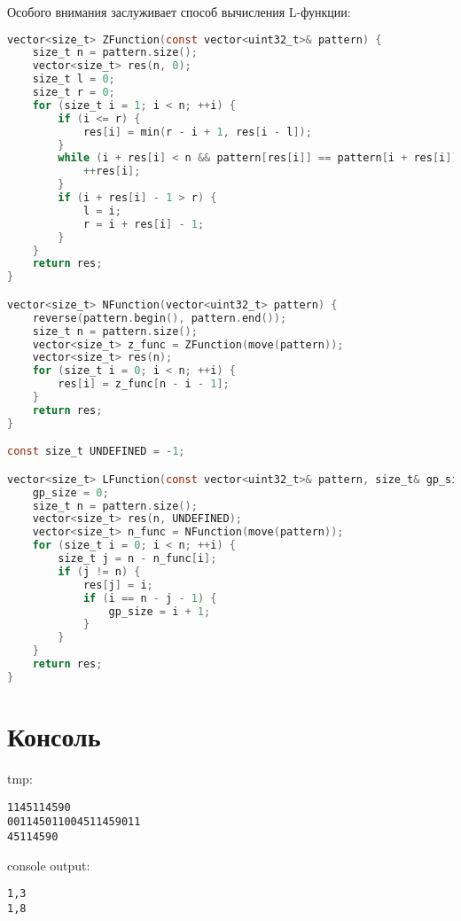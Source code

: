 Особого внимания заслуживает способ вычисления L-функции:
\begin{lstlisting}[language=C]
vector<size_t> ZFunction(const vector<uint32_t>& pattern) {
	size_t n = pattern.size();
	vector<size_t> res(n, 0);
	size_t l = 0;
	size_t r = 0;
	for (size_t i = 1; i < n; ++i) {
		if (i <= r) {
			res[i] = min(r - i + 1, res[i - l]);
		}
		while (i + res[i] < n && pattern[res[i]] == pattern[i + res[i]]) {
			++res[i];
		}
		if (i + res[i] - 1 > r) {
			l = i;
			r = i + res[i] - 1;
		}
	}
	return res;
}

vector<size_t> NFunction(vector<uint32_t> pattern) {
	reverse(pattern.begin(), pattern.end());
	size_t n = pattern.size();
	vector<size_t> z_func = ZFunction(move(pattern));
	vector<size_t> res(n);
	for (size_t i = 0; i < n; ++i) {
		res[i] = z_func[n - i - 1];
	}
	return res;
}

const size_t UNDEFINED = -1;

vector<size_t> LFunction(const vector<uint32_t>& pattern, size_t& gp_size) {
	gp_size = 0;
	size_t n = pattern.size();
	vector<size_t> res(n, UNDEFINED);
	vector<size_t> n_func = NFunction(move(pattern));
	for (size_t i = 0; i < n; ++i) {
		size_t j = n - n_func[i];
		if (j != n) {
			res[j] = i;
			if (i == n - j - 1) {
				gp_size = i + 1;
			}
		}
	}
	return res;
}
\end{lstlisting}

\section{Консоль}
tmp:
\begin{alltt}
11 45 11 45 90
0011 45 011 0045 11 45 90    11
45 11 45 90
\end{alltt}

console output:
\begin{alltt}
1, 3
1, 8
\end{alltt}
\pagebreak